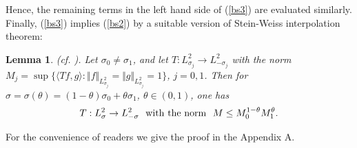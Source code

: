 \documentclass[reqno]{amsart}
\newtheorem{lemma}[theorem]{Lemma}
\numberwithin{equation}{section}
\begin{document}
Hence, the  remaining terms  in the left hand side of  (\ref{bs3})  are evaluated similarly. 
Finally,  (\ref{bs3})  implies  (\ref{bs2}) by a suitable version of Stein-Weiss interpolation theorem: 
\begin{lemma}\label {RT} (cf. \cite[Theorem 5.4.1]{BL}).
Let $\sigma_0\ne \sigma_1$, and  let
$T: L^2_{\sigma_j}\to L^2_{-\sigma_j}$   with the norm $M_j=\sup\{\langle Tf,g\rangle: \Vert f\Vert_{L^2_{\sigma_j}}=\Vert g\Vert_{L^2_{\sigma_j}}=1\}$, $j=0,1$.
Then for $\sigma=\sigma(\theta)=(1-\theta)\sigma_0+\theta\sigma_1$, $\theta\in(0,1)$,  one has
$$
T: L^2_{\sigma}\to L^2_{-\sigma}  ~~{\rm with}~{\rm the}~{\rm norm}~~ M\le M_0^{1-\theta}M_1^{\theta}.
$$
\end{lemma}
For the convenience of readers we give the  proof in the Appendix A.
\end{document}

